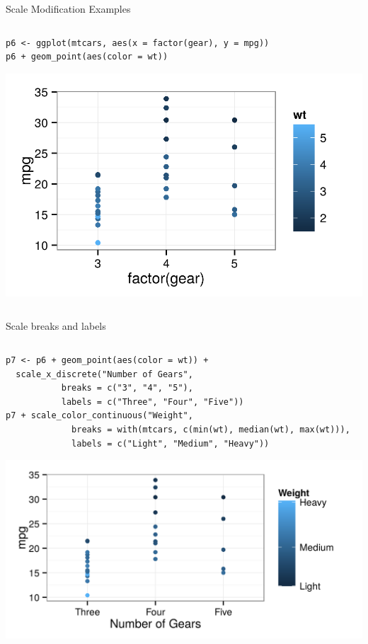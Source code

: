 \documentclass[table,smaller]{beamer}
\begin{document}
\begin{frame}[fragile,label=sec-4-3]{Scale Modification Examples}
 \begin{columns}  \begin{block}{}

\begin{verbatim}
p6 <- ggplot(mtcars, aes(x = factor(gear), y = mpg))
p6 + geom_point(aes(color = wt))
\end{verbatim}

\includegraphics[width=.9\linewidth]{images/modifyScales1.png}

\end{block} \end{columns}
\end{frame}

\begin{frame}[fragile,label=sec-4-4]{Scale breaks and labels}
 \begin{columns}  \begin{block}{}

\begin{verbatim}
p7 <- p6 + geom_point(aes(color = wt)) +
  scale_x_discrete("Number of Gears",
		   breaks = c("3", "4", "5"),
		   labels = c("Three", "Four", "Five"))
p7 + scale_color_continuous("Weight",
			 breaks = with(mtcars, c(min(wt), median(wt), max(wt))),
			 labels = c("Light", "Medium", "Heavy"))
\end{verbatim}

\includegraphics[width=.9\linewidth]{images/modifyScales2.png}

\end{block} \end{columns}
\end{frame}
\end{document}
